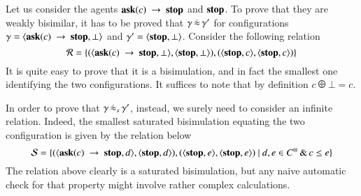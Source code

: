 \documentclass[main.tex]{subfiles}
\begin{document}
%

\begin{example}
\label{ex:barbvslabbis1}
Let us consider the agents ${\bf ask}(c) \ \rightarrow \ \mbox{{\bf stop}}$ and ${\mbox{{\bf stop}}}$. To prove that they are weakly bisimilar, it has to be proved that 
$\gamma\,\dot{\approx}\,\gamma'$ for configurations $\gamma = \langle {\bf ask}(c) \ \rightarrow \ \mbox{{\bf stop}},\bot \rangle$ and $\gamma' = \langle \mbox{{\bf stop}},\bot \rangle$.
%
Consider the following relation
\[ \mathcal{R} = \{ (\langle {\bf ask}(c) \ \rightarrow \ \mbox{{\bf stop}},\bot \rangle, \langle \mbox{{\bf stop}},\bot \rangle), (\langle \mbox{{\bf stop}},c \rangle, \langle \mbox{{\bf stop}},c \rangle)\} \]
It is quite easy to prove that it is a bisimulation, and in fact the smallest one identifying the two configurations. It suffices to note that 
by definition $c \odiv \bot = c$.

In order to prove that $\gamma\,\dot{\approx}_{s}\,\gamma'$, instead, we surely need to consider an infinite relation. Indeed, the smallest saturated bisimulation equating the 
two configuration is given by the relation below
\[
\mathcal{S} = \{ (\langle {\bf ask}(c) \ \rightarrow \ \mbox{{\bf stop}},d \rangle, \langle \mbox{{\bf stop}},d \rangle), (\langle \mbox{{\bf stop}},e \rangle, \langle \mbox{{\bf stop}},e \rangle) \ |\ d, e \in C^\otimes\, \&\, c \leq e\} 
\]
The relation above clearly is a saturated bisimulation, but any naive automatic check for that property might involve rather complex 
calculations.

\end{example}
\end{document}
